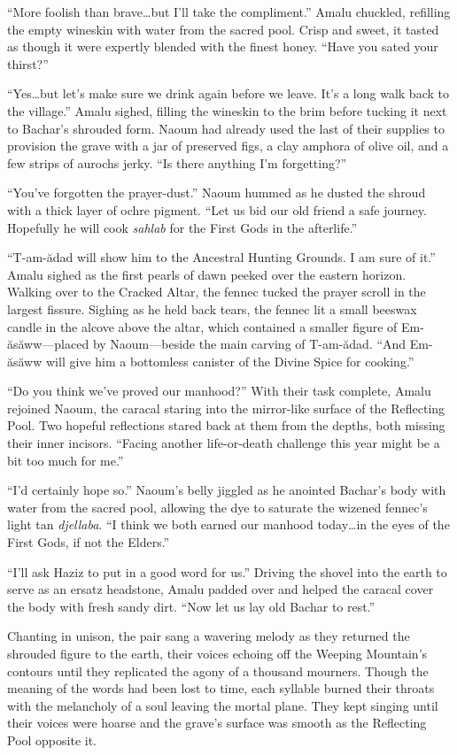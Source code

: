 ``More foolish than brave\ldots{}but I'll take the compliment.'' Amalu chuckled, refilling the empty wineskin with water from the sacred pool. Crisp and sweet, it tasted as though it were expertly blended with the finest honey. ``Have you sated your thirst?''

``Yes\ldots{}but let's make sure we drink again before we leave. It's a long walk back to the village.'' Amalu sighed, filling the wineskin to the brim before tucking it next to Bachar's shrouded form. Naoum had already used the last of their supplies to provision the grave with a jar of preserved figs, a clay amphora of olive oil, and a few strips of aurochs jerky. ``Is there anything I'm forgetting?''

``You've forgotten the prayer-dust.'' Naoum hummed as he dusted the shroud with a thick layer of ochre pigment. ``Let us bid our old friend a safe journey. Hopefully he will cook \emph{sahlab} for the First Gods in the afterlife.''

``T-am-ădad will show him to the Ancestral Hunting Grounds. I am sure of it.'' Amalu sighed as the first pearls of dawn peeked over the eastern horizon. Walking over to the Cracked Altar, the fennec tucked the prayer scroll in the largest fissure. Sighing as he held back tears, the fennec lit a small beeswax candle in the alcove above the altar, which contained a smaller figure of Em-ăsăww---placed by Naoum---beside the main carving of T-am-ădad. ``And Em-ăsăww will give him a bottomless canister of the Divine Spice for cooking.''

``Do you think we've proved our manhood?'' With their task complete, Amalu rejoined Naoum, the caracal staring into the mirror-like surface of the Reflecting Pool. Two hopeful reflections stared back at them from the depths, both missing their inner incisors. ``Facing another life-or-death challenge this year might be a bit too much for me.''

``I'd certainly hope so.'' Naoum's belly jiggled as he anointed Bachar's body with water from the sacred pool, allowing the dye to saturate the wizened fennec's light tan \emph{djellaba}. ``I think we both earned our manhood today\ldots{}in the eyes of the First Gods, if not the Elders.''

``I'll ask Haziz to put in a good word for us.'' Driving the shovel into the earth to serve as an ersatz headstone, Amalu padded over and helped the caracal cover the body with fresh sandy dirt. ``Now let us lay old Bachar to rest.''

Chanting in unison, the pair sang a wavering melody as they returned the shrouded figure to the earth, their voices echoing off the Weeping Mountain's contours until they replicated the agony of a thousand mourners. Though the meaning of the words had been lost to time, each syllable burned their throats with the melancholy of a soul leaving the mortal plane. They kept singing until their voices were hoarse and the grave's surface was smooth as the Reflecting Pool opposite it.

